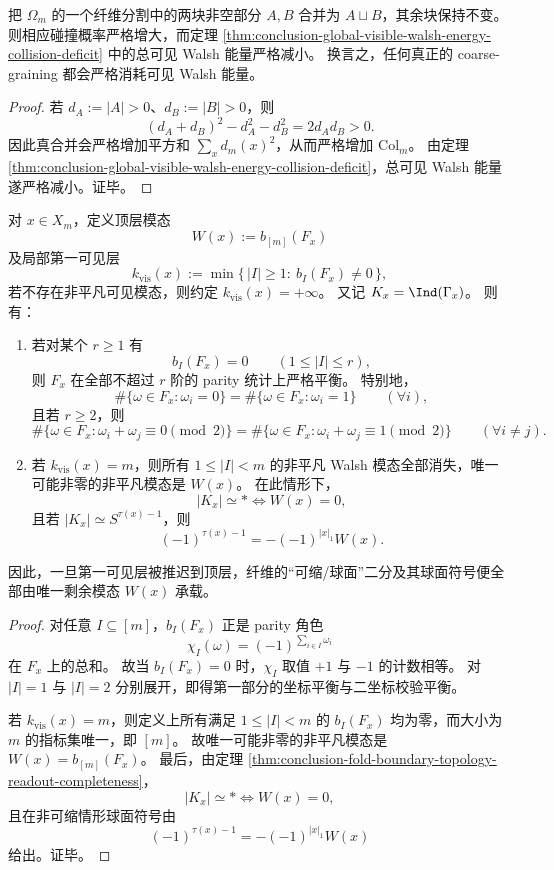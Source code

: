 \begin{corollary}\label{cor:conclusion-coarse-graining-consumes-visible-walsh-energy}
把 \(\Omega_m\) 的一个纤维分割中的两块非空部分 \(A,B\) 合并为 \(A\sqcup B\)，其余块保持不变。
则相应碰撞概率严格增大，而定理 \ref{thm:conclusion-global-visible-walsh-energy-collision-deficit} 中的总可见 Walsh 能量严格减小。
换言之，任何真正的 coarse-graining 都会严格消耗可见 Walsh 能量。
\end{corollary}

\begin{proof}
若 \(d_A:=|A|>0\)、\(d_B:=|B|>0\)，则
\[
(d_A+d_B)^2-d_A^2-d_B^2=2d_Ad_B>0.
\]
因此真合并会严格增加平方和 \(\sum_x d_m(x)^2\)，从而严格增加 \(\mathrm{Col}_m\)。
由定理 \ref{thm:conclusion-global-visible-walsh-energy-collision-deficit}，总可见 Walsh 能量遂严格减小。证毕。
\end{proof}

\begin{theorem}[低阶奇偶平衡与顶层模态承载的拓扑读出]\label{thm:conclusion-fiber-loworder-parity-balance-topmode-topology}
对 \(x\in X_m\)，定义顶层模态
\[
W(x):=b_{[m]}(F_x)
\]
及局部第一可见层
\[
k_{\mathrm{vis}}(x):=\min\{\,|I|\ge 1:\ b_I(F_x)\neq 0\,\},
\]
若不存在非平凡可见模态，则约定 \(k_{\mathrm{vis}}(x)=+\infty\)。
又记 \(K_x=\Ind(\Gamma_x)\)。
则有：
\begin{enumerate}
  \item 若对某个 \(r\ge 1\) 有
  \[
  b_I(F_x)=0\qquad (1\le |I|\le r),
  \]
  则 \(F_x\) 在全部不超过 \(r\) 阶的 parity 统计上严格平衡。
  特别地，
  \[
  \#\{\omega\in F_x:\omega_i=0\}
  =
  \#\{\omega\in F_x:\omega_i=1\}
  \qquad(\forall i),
  \]
  且若 \(r\ge 2\)，则
  \[
  \#\{\omega\in F_x:\omega_i+\omega_j\equiv 0\!\!\!\pmod 2\}
  =
  \#\{\omega\in F_x:\omega_i+\omega_j\equiv 1\!\!\!\pmod 2\}
  \qquad(\forall i\neq j).
  \]
  \item 若 \(k_{\mathrm{vis}}(x)=m\)，则所有 \(1\le |I|<m\) 的非平凡 Walsh 模态全部消失，唯一可能非零的非平凡模态是 \(W(x)\)。
  在此情形下，
  \[
  |K_x|\simeq * \iff W(x)=0,
  \]
  且若 \(|K_x|\simeq S^{\tau(x)-1}\)，则
  \[
  (-1)^{\tau(x)-1}=-(-1)^{|x|_1}W(x).
  \]
\end{enumerate}
因此，一旦第一可见层被推迟到顶层，纤维的“可缩/球面”二分及其球面符号便全部由唯一剩余模态 \(W(x)\) 承载。
\end{theorem}

\begin{proof}
对任意 \(I\subseteq[m]\)，\(b_I(F_x)\) 正是 parity 角色
\[
\chi_I(\omega)=(-1)^{\sum_{i\in I}\omega_i}
\]
在 \(F_x\) 上的总和。
故当 \(b_I(F_x)=0\) 时，\(\chi_I\) 取值 \(+1\) 与 \(-1\) 的计数相等。
对 \(|I|=1\) 与 \(|I|=2\) 分别展开，即得第一部分的坐标平衡与二坐标校验平衡。

若 \(k_{\mathrm{vis}}(x)=m\)，则定义上所有满足 \(1\le |I|<m\) 的 \(b_I(F_x)\) 均为零，而大小为 \(m\) 的指标集唯一，即 \([m]\)。
故唯一可能非零的非平凡模态是 \(W(x)=b_{[m]}(F_x)\)。
最后，由定理 \ref{thm:conclusion-fold-boundary-topology-readout-completeness}，
\[
|K_x|\simeq * \iff W(x)=0,
\]
且在非可缩情形球面符号由
\[
(-1)^{\tau(x)-1}=-(-1)^{|x|_1}W(x)
\]
给出。证毕。
\end{proof}

